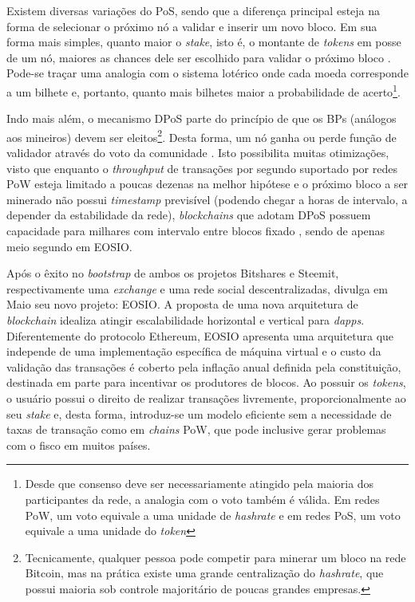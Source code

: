 \documentclass[a4paper,12pt]{monografia}
\theoremstyle{plain}
\theoremstyle{definition}
\theoremstyle{remark}
\begin{document}
Existem diversas varia\c{c}\~oes do PoS, sendo que a diferen\c{c}a principal esteja na forma de selecionar o pr\'oximo n\'o a validar e inserir um novo bloco.
Em sua forma mais simples, quanto maior o \textit{stake}, isto \'e, o montante de \textit{tokens} em posse de um n\'o, maiores as chances dele ser escolhido para validar o pr\'oximo bloco \cite{pos}.
Pode-se tra\c{c}ar uma analogia com o sistema lot\'{e}rico onde cada moeda corresponde a um bilhete e, portanto, quanto mais bilhetes maior a probabilidade de acerto\footnote{Desde que consenso deve ser necessariamente atingido pela maioria dos participantes da rede, a analogia com o voto tamb\'em \'e v\'alida. Em redes PoW, um voto equivale a uma unidade de \textit{hashrate} e em redes PoS, um voto equivale a uma unidade do \textit{token}}.

Indo mais al\'em, o mecanismo DPoS parte do princ\'ipio de que os BPs (an\'{a}logos aos mineiros) devem ser eleitos\footnote{Tecnicamente, qualquer pessoa pode competir para minerar um bloco na rede Bitcoin, mas na pr\'atica existe uma grande centraliza\c{c}\~ao do \textit{hashrate}, que possui maioria sob controle majorit\'ario de poucas grandes empresas.}.
Desta forma, um n\'o ganha ou perde fun\c{c}\~ao de validador atrav\'es do voto da comunidade \cite{dpos}.
Isto possibilita muitas otimiza\c{c}\~oes, visto que enquanto o \textit{throughput} de transa\c{c}\~oes por segundo suportado por redes PoW esteja limitado a poucas dezenas na melhor hip\'otese e o pr\'oximo bloco a ser minerado n\~ao possui \textit{timestamp} previs\'ivel (podendo chegar a horas de intervalo, a depender da estabilidade da rede), \textit{blockchains} que adotam DPoS possuem capacidade para milhares com intervalo entre blocos fixado \cite{bitshares}, sendo de apenas meio segundo em EOSIO.

Ap\'os o \^exito no \textit{bootstrap} de ambos os projetos Bitshares e Steemit, respectivamente uma \textit{exchange} e uma rede social descentralizadas,  divulga em Maio seu novo projeto: EOSIO.
A proposta de uma nova arquitetura de \textit{blockchain} idealiza atingir escalabilidade horizontal e vertical para \textit{dapps}.
Diferentemente do protocolo Ethereum, EOSIO apresenta uma arquitetura que independe de uma implementa\c{c}\~{a}o espec\'{i}fica de m\'{a}quina virtual e o custo da valida\c{c}\~ao das transa\c{c}\~oes \'{e} coberto pela infla\c{c}\~{a}o anual definida pela constitui\c{c}\~{a}o, destinada em parte para incentivar os produtores de blocos.
Ao possuir os \textit{tokens}, o usu\'{a}rio possui o direito de realizar transa\c{c}\~{o}es livremente, proporcionalmente ao seu \textit{stake} e, desta forma, introduz-se um modelo eficiente sem a necessidade de taxas de transa\c{c}\~{a}o como em \textit{chains} PoW, que pode inclusive gerar problemas com o fisco em muitos pa\'{i}ses.
\end{document}
